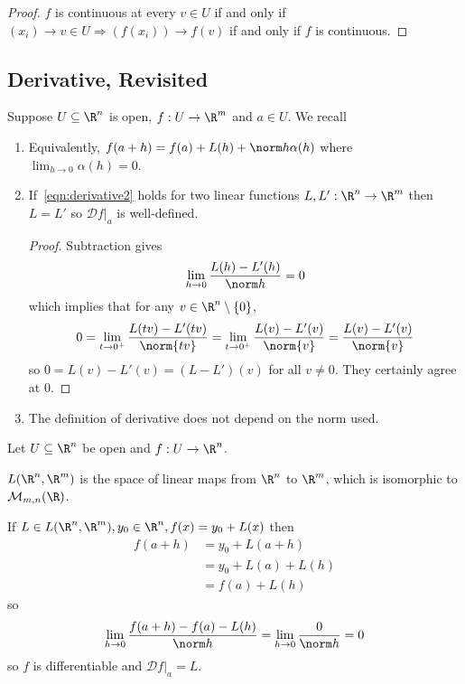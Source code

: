 \documentclass[a4paper]{article}
\newcommand*{\D}{\mathcal{D}}
\theoremstyle{definition}
\begin{document}
\begin{proof}
  \(f\) is continuous at every \(v \in U\) if and only if \((x_i) \to v \in U \Rightarrow (f(x_i)) \to f(v)\) if and only if \(f\) is continuous.
\end{proof}

\subsection{Derivative, Revisited}

Suppose \(U \subseteq \R^n\) is open, \(f: U \to \R^m\) and \(a \in U\). We recall

\differentiability*

\begin{note}\leavevmode
  \begin{enumerate}
  \item Equivalently, \(f(a + h) = f(a) + L(h) + \norm h \alpha(h)\) where \(\lim_{h \to 0}\alpha(h) = 0\).
  \item If~\eqref{eqn:derivative2} holds for two linear functions \(L, L': \R^n \to \R^m\) then \(L = L'\) so \(\D f|_a\) is well-defined.
    \begin{proof}
      Subtraction gives
      \[
        \lim_{h \to 0} \frac{L(h) - L'(h)}{\norm h} = 0
      \]
      which implies that for any \(v \in \R^n\setminus\{0\}\),
      \[
        0 = \lim_{t \to 0^+} \frac{L(t v) - L'(t v)}{\norm{tv}} = \lim_{t \to 0^+} \frac{L(v) - L'(v)}{\norm{v}} = \frac{L(v) - L'(v)}{\norm{v}}
      \]
      so \(0 = L(v) - L'(v) = (L - L')(v)\) for all \(v \neq 0\). They certainly agree at \(0\).
    \end{proof}
  \item The definition of derivative does not depend on the norm used.
  \end{enumerate}
\end{note}

Let \(U \subseteq \R^n\) be open and \(f: U \to \R^n\).

\begin{notation}
  \(L(\R^n, \R^m)\) is the space of linear maps from \(\R^n\) to \(\R^m\), which is isomorphic to \(\mathcal{M}_{m, n}(\R)\).
\end{notation}

\begin{eg}
  If \(L \in L(\R^n, \R^m), y_0 \in \R^n, f(x) = y_0 + L(x)\) then
  \begin{align*}
    f(a + h) &= y_0 + L(a + h) \\
             &= y_0 + L(a) + L(h) \\
             &= f(a) + L(h)
  \end{align*}
  so
  \[
    \lim_{h \to 0} \frac{f(a + h) - f(a) - L(h)}{\norm h} = \lim_{h \to 0} \frac{0}{\norm h} = 0
  \]
  so \(f\) is differentiable and \(\D f|_a = L\).
\end{eg}
\end{document}
